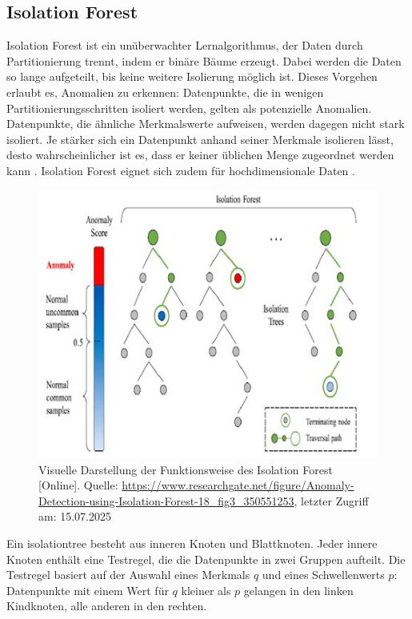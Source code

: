 \documentclass[a4paper,12pt]{article}
\begin{document}
	\subsection{Isolation Forest}
	Isolation Forest ist ein unüberwachter Lernalgorithmus, der Daten durch Partitionierung trennt, indem er binäre Bäume erzeugt. Dabei werden die Daten so lange aufgeteilt, bis keine weitere Isolierung möglich ist. Dieses Vorgehen erlaubt es, Anomalien zu erkennen: Datenpunkte, die in wenigen Partitionierungsschritten isoliert werden, gelten als potenzielle Anomalien. Datenpunkte, die ähnliche Merkmalswerte aufweisen, werden dagegen nicht stark isoliert. Je stärker sich ein Datenpunkt anhand seiner Merkmale isolieren lässt, desto wahrscheinlicher ist es, dass er keiner üblichen Menge zugeordnet werden kann \cite[S. 2]{liu2008isolation}. Isolation Forest eignet sich zudem für hochdimensionale Daten \cite[S. 10]{liu2008isolation}.
	\\[0.5em]
	\begin{figure}[H]
		\centering
		\includegraphics[width=0.9\linewidth]{Bilder/screenshot005}
		\caption{Visuelle Darstellung der Funktionsweise des Isolation Forest [Online]. Quelle: \url{https://www.researchgate.net/figure/Anomaly-Detection-using-Isolation-Forest-18\_fig3\_350551253}, letzter Zugriff am: 15.07.2025}
		\label{fig:screenshot005}
	\end{figure}
	Ein \gls{isolationtree} besteht aus inneren Knoten und Blattknoten. Jeder innere Knoten enthält eine Testregel, die die Datenpunkte in zwei Gruppen aufteilt. Die Testregel basiert auf der Auswahl eines Merkmals \(q\) und eines Schwellenwerts \(p\): Datenpunkte mit einem Wert für \(q\) kleiner als \(p\) gelangen in den linken Kindknoten, alle anderen in den rechten.
\end{document}
